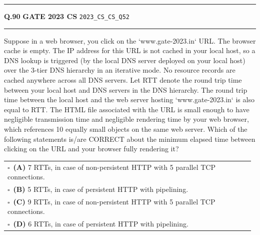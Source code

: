 \documentclass[a4paper,10pt]{article}
\begin{document}
\vspace{6pt}\hrule height 0.35pt\vspace{6pt}
\noindent
\begin{tcolorbox}[
    blanker,
    sidebyside,
    sidebyside align=top,
    lefthand width=0.55\textwidth,
    top=4pt, bottom=4pt, left=0pt, right=0pt,
    middle=16pt,
    underlay={
        \draw[dashed, black!80, line width=0.8pt, dash pattern=on 4pt off 3pt]
            ([xshift=0.55\textwidth+8pt]frame.north west) --
            ([xshift=0.55\textwidth+8pt]frame.south west);
    }
]
\textbf{Q.90}  \hfill {\footnotesize\textbf{GATE 2023 CS} \quad \tiny\texttt{2023\_CS\_CS\_Q52}}
\vspace{2pt}\hrule height 0.3pt\vspace{4pt}

Suppose in a web browser, you click on the `www.gate-2023.in` URL. The browser cache is empty. The IP address for this URL is not cached in your local host, so a DNS lookup is triggered (by the local DNS server deployed on your local host) over the 3-tier DNS hierarchy in an iterative mode. No resource records are cached anywhere across all DNS servers.
Let RTT denote the round trip time between your local host and DNS servers in the DNS hierarchy. The round trip time between the local host and the web server hosting `www.gate-2023.in` is also equal to RTT. The HTML file associated with the URL is small enough to have negligible transmission time and negligible rendering time by your web browser, which references 10 equally small objects on the same web server.
Which of the following statements is/are CORRECT about the minimum elapsed time between clicking on the URL and your browser fully rendering it?

\par\vspace{6pt}\noindent
\begin{tabular}{@{}p{0.98\linewidth}@{}}
$\square$\ \textbf{(A)} 7 RTTs, in case of non-persistent HTTP with 5 parallel TCP connections. \\
\addlinespace[3pt]
$\square$\ \textbf{(B)} 5 RTTs, in case of persistent HTTP with pipelining. \\
\addlinespace[3pt]
$\square$\ \textbf{(C)} 9 RTTs, in case of non-persistent HTTP with 5 parallel TCP connections. \\
\addlinespace[3pt]
$\square$\ \textbf{(D)} 6 RTTs, in case of persistent HTTP with pipelining.
\end{tabular}


\end{tcolorbox}
\end{document}
